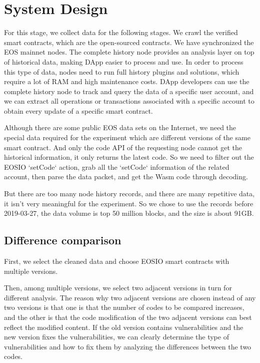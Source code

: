 \documentclass[a4paper, 10pt, conference, twocolumn]{ieeeconf}       %
\begin{document}
\section{System Design}


For this stage, we collect data for the following stages.
We crawl the verified smart contracts, which are the open-sourced contracts.
We have synchronized the EOS mainnet nodes.
The complete history node provides an analysis layer on top of historical data,
making DApp easier to process and use.
In order to process this type of data, nodes need to run full history plugins and solutions,
which require a lot of RAM and high maintenance costs.
DApp developers can use the complete history node to track and query the data of a specific user account,
and we can extract all operations or transactions associated with a specific account to obtain every update of a specific smart contract.

Although there are some public EOS data sets on the Internet,
we need the special data required for the experiment which are different versions of the same smart contract.
And only the code API of the requesting node cannot get the historical information,
it only returns the latest code.
So we need to filter out the EOSIO `setCode` action, grab all the `setCode` information of the related account, then parse the data packet, and get the Wasm code through decoding.

But there are too many node history records,
and there are many repetitive data,
it isn't very meaningful for the experiment.
So we chose to use the records before 2019-03-27,
the data volume is top 50 million blocks,
and the size is about 91GB.

\subsection{Difference comparison}
First, we select the cleaned data and choose EOSIO smart contracts with multiple versions.

Then, among multiple versions,
we select two adjacent versions in turn for different analysis.
The reason why two adjacent versions are chosen instead of any two versions is that one is that the number of codes to be compared increases,
and the other is that the code modification of the two adjacent versions can best reflect the modified content.
If the old version contains vulnerabilities and the new version fixes the vulnerabilities,
we can clearly determine the type of vulnerabilities and how to fix them by analyzing the differences between the two codes.
\end{document}
